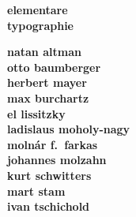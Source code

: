 \documentclass{article}
\begin{document}
  \NewCoffin \result
  \NewCoffin \aaa
  \NewCoffin \bbb
  \NewCoffin \ccc
  \NewCoffin \ddd
  \NewCoffin \eee
  \NewCoffin \fff
  \NewCoffin {}
  \NewCoffin {}
  \NewCoffin {}

\SetHorizontalCoffin \result {}
\SetHorizontalCoffin {}
\SetHorizontalCoffin {}
\SetHorizontalCoffin {}
\SetHorizontalCoffin {}
\SetVerticalCoffin \eee {180pt}
                 {\raggedleft\fontsize{31}{36}\sffamily\bfseries
                      elementare\\
                      typographie}
\SetVerticalCoffin \fff {140pt}
                 {\raggedright \fontsize{13}{14}\sffamily\bfseries
                       natan altman \\
                       otto baumberger \\
                       herbert mayer \\
                       max burchartz \\
                       el lissitzky \\
                       ladislaus moholy-nagy \\
                       moln\'ar f.~farkas \\
                       johannes molzahn \\
                       kurt schwitters \\
                       mart stam \\
                       ivan tschichold}

\RotateCoffin {}
\RotateCoffin {}

\SetHorizontalCoffin {}
\SetHorizontalCoffin {}
\SetHorizontalCoffin {}
\end{document}
